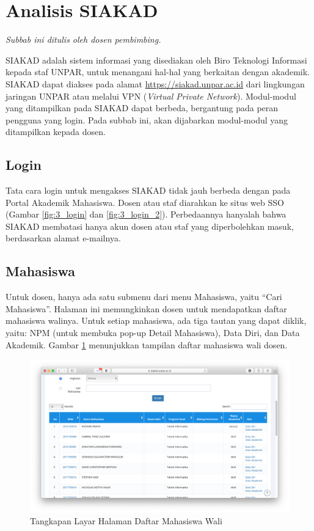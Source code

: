     
\section{Analisis SIAKAD}

\textit{Subbab ini ditulis oleh dosen pembimbing.}

SIAKAD adalah sistem informasi yang disediakan oleh Biro Teknologi Informasi kepada staf UNPAR, untuk menangani hal-hal yang berkaitan dengan akademik. SIAKAD dapat diakses pada alamat \url{https://siakad.unpar.ac.id} dari lingkungan jaringan UNPAR atau melalui VPN (\textit{Virtual Private Network}). Modul-modul yang ditampilkan pada SIAKAD dapat berbeda, bergantung pada peran pengguna yang login. Pada subbab ini, akan dijabarkan modul-modul yang ditampilkan kepada dosen.

\subsection{Login}

Tata cara login untuk mengakses SIAKAD tidak jauh berbeda dengan pada Portal Akademik Mahasiswa. Dosen atau staf diarahkan ke situs web SSO (Gambar \ref{fig:3_login} dan \ref{fig:3_login_2}). Perbedaannya hanyalah bahwa SIAKAD membatasi hanya akun dosen atau staf yang diperbolehkan masuk, berdasarkan alamat e-mailnya.

\subsection{Mahasiswa}

Untuk dosen, hanya ada satu submenu dari menu Mahasiswa, yaitu ``Cari Mahasiswa''. Halaman ini memungkinkan dosen untuk mendapatkan daftar mahasiswa walinya. Untuk setiap mahasiswa, ada tiga tautan yang dapat diklik, yaitu: NPM (untuk membuka pop-up Detail Mahasiswa), Data Diri, dan Data Akademik. Gambar \ref{fig:3_siakad_carimahasiswa} menunjukkan tampilan daftar mahasiswa wali dosen.

\begin{figure}[H]
    \centering
    \includegraphics[scale=0.35]{Gambar/siakad_carimahasiswa.png}
    \caption{Tangkapan Layar Halaman Daftar Mahasiswa Wali}
    \label{fig:3_siakad_carimahasiswa}
\end{figure}

